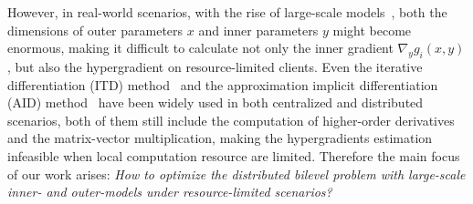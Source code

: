 \documentclass[lettersize,journal]{IEEEtran}
\begin{document}
However, in real-world scenarios, with the rise of large-scale models~\cite{he2016deep,wang2024explicit,wen2023byzantine}, both the dimensions of outer parameters $x$ and inner parameters $y$ might become enormous, making it difficult to calculate not only the inner gradient $\nabla_y g_{i}(x,y)$, but also the hypergradient on resource-limited clients. Even the iterative differentiation (ITD) method~\cite{shaban2019truncated,domke2012generic} and the approximation implicit differentiation (AID) method~\cite{xiao2023communication,yang2024simfbo} 
have been widely used in both centralized and distributed scenarios, both of them still include the computation of higher-order derivatives and the matrix-vector multiplication, making the hypergradients estimation infeasible 
when local computation resource are limited. Therefore the main focus of our work arises: 
\textit{How to optimize the distributed bilevel problem with large-scale inner- and outer-models under resource-limited scenarios?} 
\IEEEpubidadjcol
\end{document}
